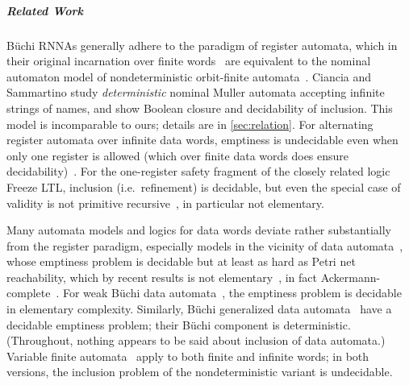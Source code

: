 \documentclass[final,a4paper,UKenglish,thm-restate,autoref,numberwithinsect]{lipics-v2021}
\numberwithin{equation}{section}
\newcommand{\+}[1]{\mathcal{#1}\xspace}
\theoremstyle{definition}
\begin{document}
\subparagraph*{Related Work} B\"uchi RNNAs generally adhere to the
paradigm of register automata, which in their original incarnation
over finite words~\cite{KaminskiFrancez94} are equivalent to the
nominal automaton model of nondeterministic orbit-finite
automata~\cite{BojanczykEA14}. Ciancia and Sammartino
\cite{CianciaSammartino14} study \emph{deterministic} nominal Muller
automata accepting %
infinite strings of names, and show %
Boolean closure and decidability of inclusion. This model is
incomparable to ours; details are in \autoref{sec:relation}. For
alternating register automata over infinite data words, emptiness is
undecidable even when only one register is allowed (which over finite
data words does ensure decidability)~\cite{DemriLazic09}. For the
one-register safety fragment of the closely related logic Freeze LTL,
inclusion (i.e.~refinement) is decidable, but even the special case of
validity is not primitive recursive~\cite{Lazic06}, in particular not
elementary.

Many automata models and logics for data words deviate rather
substantially from the register paradigm, especially models in the
vicinity of data automata~\cite{BojanczykEA11}, whose emptiness
problem is decidable but at least as hard as Petri net reachability,
which by recent results is not elementary~\cite{CzerwinskiEA21}, in
fact Ackermann-complete~\cite{Leroux21,CzerwinskiOrlikowski21}. For
weak B\"uchi data automata~\cite{KaraEA12}, the emptiness problem is
decidable in elementary complexity. Similarly, Büchi generalized data
automata~\cite{ColcombetManuel14} have a decidable emptiness problem;
their B\"uchi component is deterministic. (Throughout, nothing appears
to be said about inclusion of data automata.) Variable finite
automata~\cite{GrumbergEA10} apply to both finite and infinite words;
in both versions, the inclusion problem of the nondeterministic
variant is undecidable.
\end{document}
